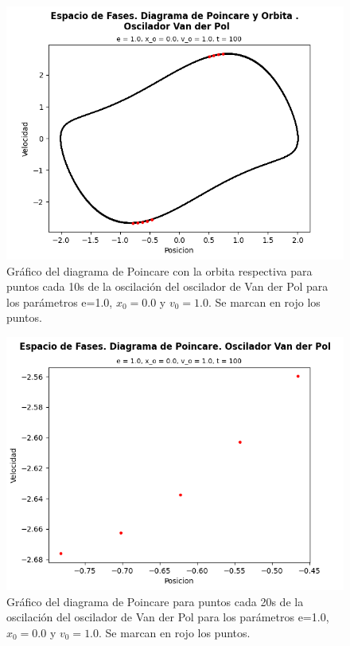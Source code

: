 \documentclass{article}
\begin{document}
	\begin{figure}[h!]
		\centering
		\ContinuedFloat
		\includegraphics[width=0.8\linewidth]{DIAGRAMA DE POINCARE Y ORBITA 1}
		\caption{Gr\'afico del diagrama de Poincare con la orbita respectiva para puntos cada 10s de la oscilaci\'on del oscilador de Van der Pol para los par\'ametros e=1.0, $x_0=0.0$ y $v_0=1.0$. Se marcan en rojo los puntos.}
	\end{figure}
	
	\begin{figure}[h!]
		\centering
		\ContinuedFloat*
		\includegraphics[width=0.8\linewidth]{DIAGRAMA DE POINCARE 2}
		\caption{Gr\'afico del diagrama de Poincare para puntos cada 20s de la oscilaci\'on del oscilador de Van der Pol para los par\'ametros e=1.0, $x_0=0.0$ y $v_0=1.0$. Se marcan en rojo los puntos.}
	\end{figure}
	
\end{document}
